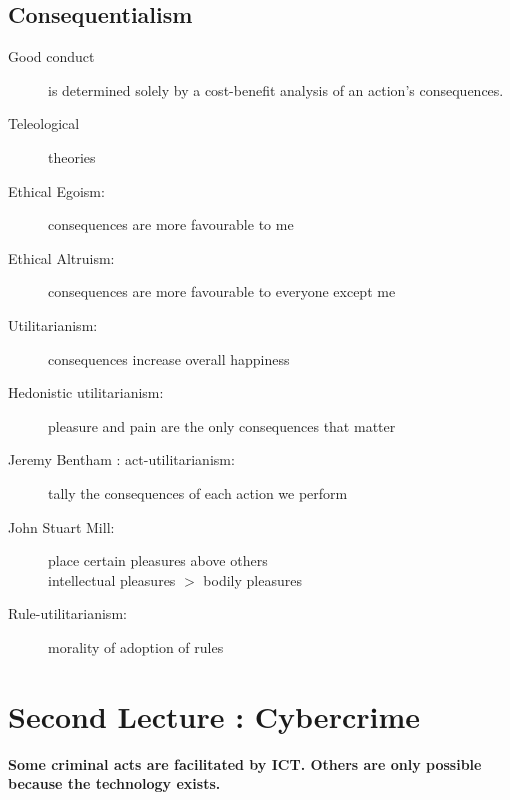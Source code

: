 \documentclass[a4paper]{article}
\begin{document}
\subsection*{Consequentialism}

\begin{description}
\item[Good conduct] is determined solely by a cost-benefit analysis of an action's consequences.
\item[Teleological] theories
\item[Ethical Egoism:] consequences are more favourable to me
\item[Ethical Altruism:] consequences are more favourable to everyone except me
\item[Utilitarianism:] consequences increase overall happiness
\item[Hedonistic utilitarianism:] pleasure and pain are the only consequences that matter
\item[Jeremy Bentham : act-utilitarianism:] tally the consequences of each action we perform
\item[John Stuart Mill:] place certain pleasures above others \\ intellectual pleasures $>$ bodily pleasures
\item[Rule-utilitarianism:] morality of adoption of rules
\end{description}

\section{Second Lecture : Cybercrime}

\textbf{Some criminal acts are facilitated by ICT. Others are only possible because the technology exists.}
\end{document}
